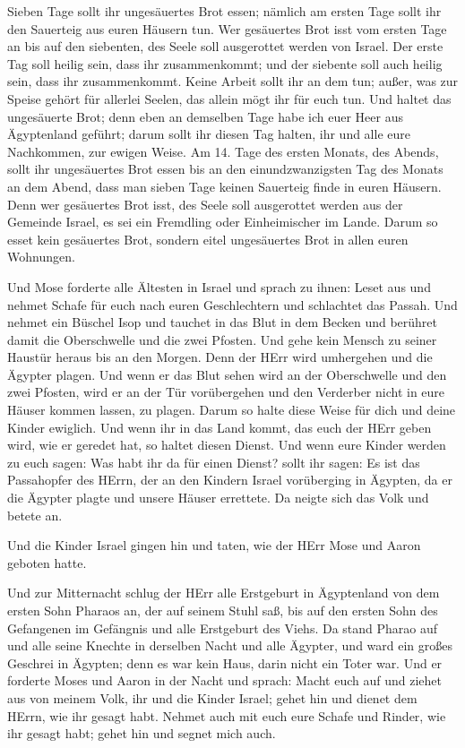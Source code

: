  Sieben Tage sollt ihr ungesäuertes Brot essen; nämlich am
ersten Tage sollt ihr den Sauerteig aus euren Häusern tun. Wer
gesäuertes Brot isst vom ersten Tage an bis auf den siebenten, des Seele
soll ausgerottet werden von Israel.  Der erste Tag soll
heilig sein, dass ihr zusammenkommt; und der siebente soll auch heilig
sein, dass ihr zusammenkommt. Keine Arbeit sollt ihr an dem tun; außer,
was zur Speise gehört für allerlei Seelen, das allein mögt ihr für euch
tun.  Und haltet das ungesäuerte Brot; denn eben an
demselben Tage habe ich euer Heer aus Ägyptenland geführt; darum sollt
ihr diesen Tag halten, ihr und alle eure Nachkommen, zur ewigen Weise.
 Am 14. Tage des ersten Monats, des Abends, sollt ihr
ungesäuertes Brot essen bis an den einundzwanzigsten Tag des Monats an
dem Abend,  dass man sieben Tage keinen Sauerteig finde in
euren Häusern. Denn wer gesäuertes Brot isst, des Seele soll ausgerottet
werden aus der Gemeinde Israel, es sei ein Fremdling oder Einheimischer
im Lande.  Darum so esset kein gesäuertes Brot, sondern
eitel ungesäuertes Brot in allen euren Wohnungen.

 Und Mose forderte alle Ältesten in Israel und sprach zu
ihnen: Leset aus und nehmet Schafe für euch nach euren Geschlechtern und
schlachtet das Passah.  Und nehmet ein Büschel Isop und
tauchet in das Blut in dem Becken und berühret damit die Oberschwelle
und die zwei Pfosten. Und gehe kein Mensch zu seiner Haustür heraus bis
an den Morgen.  Denn der HErr wird umhergehen und die
Ägypter plagen. Und wenn er das Blut sehen wird an der Oberschwelle und
den zwei Pfosten, wird er an der Tür vorübergehen und den Verderber
nicht in eure Häuser kommen lassen, zu plagen.  Darum so
halte diese Weise für dich und deine Kinder ewiglich.  Und
wenn ihr in das Land kommt, das euch der HErr geben wird, wie er geredet
hat, so haltet diesen Dienst.  Und wenn eure Kinder werden
zu euch sagen: Was habt ihr da für einen Dienst?  sollt ihr
sagen: Es ist das Passahopfer des HErrn, der an den Kindern Israel
vorüberging in Ägypten, da er die Ägypter plagte und unsere Häuser
errettete. Da neigte sich das Volk und betete an.

 Und die Kinder Israel gingen hin und taten, wie der HErr
Mose und Aaron geboten hatte.

 Und zur Mitternacht schlug der HErr alle Erstgeburt in
Ägyptenland von dem ersten Sohn Pharaos an, der auf seinem Stuhl saß,
bis auf den ersten Sohn des Gefangenen im Gefängnis und alle Erstgeburt
des Viehs.  Da stand Pharao auf und alle seine Knechte in
derselben Nacht und alle Ägypter, und ward ein großes Geschrei in
Ägypten; denn es war kein Haus, darin nicht ein Toter war. 
Und er forderte Moses und Aaron in der Nacht und sprach: Macht euch auf
und ziehet aus von meinem Volk, ihr und die Kinder Israel; gehet hin und
dienet dem HErrn, wie ihr gesagt habt.  Nehmet auch mit
euch eure Schafe und Rinder, wie ihr gesagt habt; gehet hin und segnet
mich auch.

